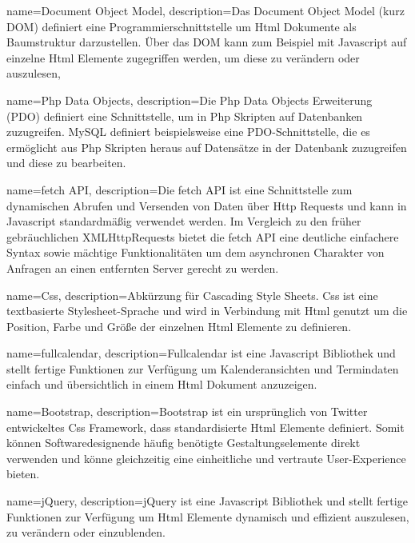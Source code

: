 {
    name=Document Object Model,
    description={Das Document Object Model (kurz DOM) definiert eine Programmierschnittstelle um \gls{Html} Dokumente als Baumstruktur darzustellen. Über das DOM kann zum Beispiel mit \gls{Javascript} auf einzelne Html Elemente zugegriffen werden, um diese zu verändern oder auszulesen,}
}

{
    name=Php Data Objects,
    description={Die Php Data Objects Erweiterung (PDO) definiert eine Schnittstelle, um in \gls{Php} Skripten auf Datenbanken zuzugreifen. \gls{MySQL} definiert beispielsweise eine PDO-Schnittstelle, die es ermöglicht aus Php Skripten heraus auf Datensätze in der Datenbank zuzugreifen und diese zu bearbeiten.}
}

{
    name=fetch API,
    description={Die fetch API ist eine Schnittstelle zum dynamischen Abrufen und Versenden von Daten über \gls{Http} Requests und kann in \gls{Javascript} standardmäßig verwendet werden. Im Vergleich zu den früher gebräuchlichen XMLHttpRequests bietet die fetch API eine deutliche einfachere Syntax sowie mächtige Funktionalitäten um dem asynchronen Charakter von Anfragen an einen entfernten Server gerecht zu werden\cite{fetchAPI}.}
}

{
    name=Css,
    description={Abkürzung für Cascading Style Sheets. Css ist eine textbasierte Stylesheet-Sprache und wird in Verbindung mit \gls{Html} genutzt um die Position, Farbe und Größe der einzelnen Html Elemente zu definieren.\cite{Css}}
}

{
    name=fullcalendar,
    description={Fullcalendar ist eine \gls{Javascript} Bibliothek und stellt fertige Funktionen zur Verfügung um Kalenderansichten und Termindaten einfach und übersichtlich in einem \gls{Html} Dokument anzuzeigen.\cite{fullCalendarWeb}}
}

{
    name=Bootstrap,
    description={Bootstrap ist ein ursprünglich von Twitter entwickeltes \gls{Css} Framework, dass standardisierte \gls{Html} Elemente definiert. Somit können Softwaredesignende häufig benötigte Gestaltungselemente direkt verwenden und könne gleichzeitig eine einheitliche und vertraute User-Experience bieten.\cite{Bootstrap}}
}

{
    name=jQuery,
    description={jQuery ist eine \gls{Javascript} Bibliothek und stellt fertige Funktionen zur Verfügung um \gls{Html} Elemente dynamisch und effizient auszulesen, zu verändern oder einzublenden.\cite{jQuery}}
}
